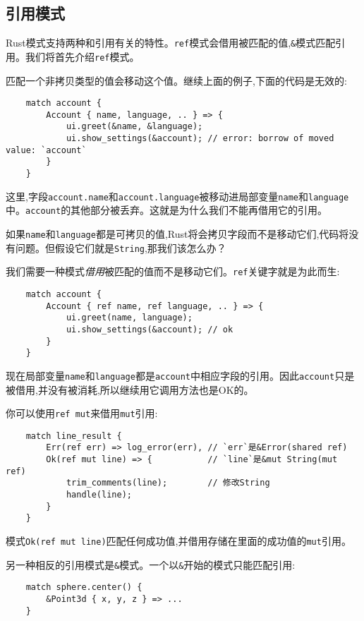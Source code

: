 \subsection{引用模式}
Rust模式支持两种和引用有关的特性。\texttt{ref}模式会借用被匹配的值,\texttt{\&}模式匹配引用。我们将首先介绍\texttt{ref}模式。

匹配一个非拷贝类型的值会移动这个值。继续上面的例子,下面的代码是无效的:
\begin{verbatim}
    match account {
        Account { name, language, .. } => {
            ui.greet(&name, &language);
            ui.show_settings(&account); // error: borrow of moved value: `account`
        }
    }
\end{verbatim}

这里,字段\texttt{account.name}和\texttt{account.language}被移动进局部变量\texttt{name}和\texttt{language}中。\texttt{account}的其他部分被丢弃。这就是为什么我们不能再借用它的引用。

如果\texttt{name}和\texttt{language}都是可拷贝的值,Rust将会拷贝字段而不是移动它们,代码将没有问题。但假设它们就是\texttt{String},那我们该怎么办？

我们需要一种模式\emph{借用}被匹配的值而不是移动它们。\texttt{ref}关键字就是为此而生:
\begin{verbatim}
    match account {
        Account { ref name, ref language, .. } => {
            ui.greet(name, language);
            ui.show_settings(&account); // ok
        }
    }
\end{verbatim}

现在局部变量\texttt{name}和\texttt{language}都是\texttt{account}中相应字段的引用。因此\texttt{account}只是被借用,并没有被消耗,所以继续用它调用方法也是OK的。

你可以使用\texttt{ref mut}来借用\texttt{mut}引用:
\begin{verbatim}
    match line_result {
        Err(ref err) => log_error(err), // `err`是&Error(shared ref)
        Ok(ref mut line) => {           // `line`是&mut String(mut ref)
            trim_comments(line);        // 修改String
            handle(line);
        }
    }
\end{verbatim}

模式\texttt{Ok(ref mut line)}匹配任何成功值,并借用存储在里面的成功值的\texttt{mut}引用。

另一种相反的引用模式是\texttt{\&}模式。一个以\texttt{\&}开始的模式只能匹配引用:
\begin{verbatim}
    match sphere.center() {
        &Point3d { x, y, z } => ...
    }
\end{verbatim}

